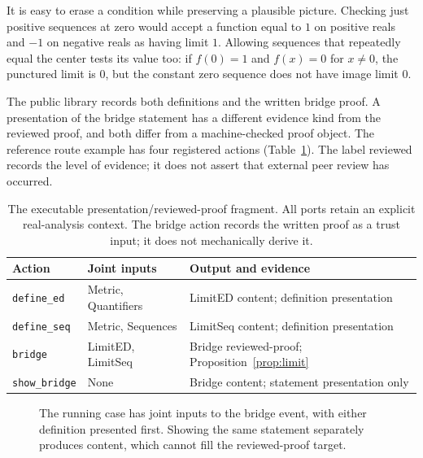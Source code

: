 \documentclass[11pt,a4paper]{article}
\theoremstyle{remark}
\begin{document}
It is easy to erase a condition while preserving a plausible picture.
Checking just positive sequences at zero would accept a function equal to
\(1\) on positive reals and \(-1\) on negative reals as having limit \(1\).
Allowing sequences that repeatedly equal the center tests its value too:
if \(f(0)=1\) and \(f(x)=0\) for \(x\neq0\), the punctured limit is \(0\),
but the constant zero sequence does not have image limit \(0\).

The public library records both definitions and the written bridge proof.
A presentation of the bridge statement has a different evidence kind
from the reviewed proof, and both differ from a machine-checked proof object.
The reference route example has four registered actions
(Table~\ref{tab:actions}). The label reviewed records the level of evidence;
it does not assert that external peer review has occurred.

\begin{table}[t]
\centering\small
\begin{tabularx}{\linewidth}{@{}lXX@{}}
\toprule Action & Joint inputs & Output and evidence \\\midrule
\texttt{define\_ed} & Metric, Quantifiers & LimitED content; definition presentation\\
\texttt{define\_seq} & Metric, Sequences & LimitSeq content; definition presentation\\
\texttt{bridge} & LimitED, LimitSeq & Bridge reviewed-proof; Proposition~\ref{prop:limit}\\
\texttt{show\_bridge} & None & Bridge content; statement presentation only\\
\bottomrule
\end{tabularx}
\caption{The executable presentation/reviewed-proof fragment. All ports retain
an explicit real-analysis context. The bridge action records the written proof
as a trust input; it does not mechanically derive it.}
\label{tab:actions}
\end{table}

\begin{figure}[t]
\centering
{}
\caption{The running case has joint inputs to the bridge event, with either
definition presented first. Showing the same statement separately produces
content, which cannot fill the reviewed-proof target.}
\label{fig:events}
\end{figure}
\end{document}
